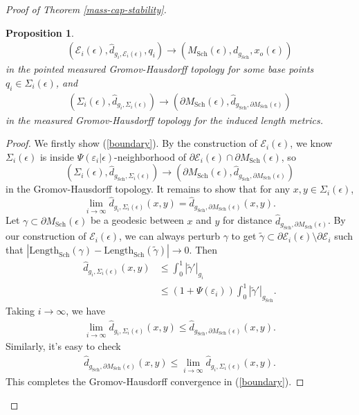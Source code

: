 \documentclass[letter]{amsart}
\newtheorem{prop}[thm]{Proposition}
\theoremstyle{definition}
\theoremstyle{remark}
\begin{document}
\begin{proof}[Proof of Theorem \ref{mass-cap-stability}]
\begin{prop}
	\begin{align}\label{total}
		(\mathcal{E}_{i}(\epsilon ), \hat{d}_{g_i, \mathcal{E}_i(\epsilon )}, q_i) \to (M_{\mathrm{Sch}}(\epsilon ), d_{g_{\mathrm{Sch}}}, x_o(\epsilon ) )
	\end{align}
	in the pointed measured Gromov-Hausdorff topology for some base points $q_i \in \Sigma _i(\epsilon )$, and
	\begin{align}\label{boundary}
		(\Sigma _i(\epsilon ), \hat{d}_{g_i, \Sigma _i(\epsilon )}) \to (\partial M_{\mathrm{Sch}}(\epsilon ), \hat{d}_{g_{\mathrm{Sch}}, \partial M_{\mathrm{Sch}}(\epsilon )} )
	\end{align}
	in the measured Gromov-Hausdorff topology for the induced length metrics.
\end{prop}
\begin{proof}
	We firstly show (\ref{boundary}). By the construction of $\mathcal{E}_i(\epsilon )$,
	we know $\Sigma _i(\epsilon )$ is inside $\Psi (\varepsilon _i| \epsilon )$-neighborhood of $\partial \mathcal{E}_i(\epsilon ) \cap \partial M_{\mathrm{Sch}}(\epsilon )$, so
		$$
		(\Sigma _i(\epsilon ), \hat{d}_{g_{\mathrm{Sch}}, \Sigma _i(\epsilon )} ) \to (\partial M_{\mathrm{Sch}}(\epsilon ), \hat{d}_{g_{\mathrm{Sch}}, \partial M_{\mathrm{Sch}}(\epsilon )})
		$$
		in the Gromov-Hausdorff topology. It remains to show that for any $x, y \in \Sigma _i(\epsilon )$,
	$$ \lim_{i\to \infty}\hat{d}_{g_i, \Sigma _i(\epsilon )}(x,y) = \hat{d}_{g_{\mathrm{Sch}}, \partial M_{\mathrm{Sch}}(\epsilon )}(x,y). $$
	Let $\gamma \subset \partial M_{\mathrm{Sch}}(\epsilon ) $ be a geodesic between $x$ and $y$ for distance $\hat{d}_{g_{\mathrm{Sch}}, \partial M_{\mathrm{Sch}}(\epsilon ) }$. By our construction of $\mathcal{E}_i(\epsilon )$, we can always perturb $\gamma $ to get $\tilde{\gamma } \subset \partial \mathcal{E}_i(\epsilon ) \setminus \partial \mathcal{E}_i$ such that $|\mathrm{Length}_{\mathrm{Sch}}(\gamma ) - \mathrm{Length}_{\mathrm{Sch}}(\tilde{\gamma })| \to 0$. Then 
	\begin{align*}
		\hat{d}_{g_i, \Sigma _i(\epsilon )}(x,y) &\leq \int_{0}^{1}|\tilde{\gamma }'|_{g_i} \\
	&\leq (1+ \Psi (\varepsilon _i) ) \int_{0}^{1}|\tilde{\gamma }'|_{g_{\mathrm{Sch}}} .
	\end{align*}
	Taking $i\to \infty$, we have
	\begin{align*}
		\lim_{i\to \infty}\hat{d}_{g_i, \Sigma _i(\epsilon )}(x,y) \leq \hat{d}_{g_{\mathrm{Sch}}, \partial M_{\mathrm{Sch}}(\epsilon )}(x,y).
	\end{align*}
	Similarly, it's easy to check 
	\begin{align*}
		\hat{d}_{g_{\mathrm{Sch}}, \partial M_{\mathrm{Sch}}(\epsilon )}(x,y) \leq \lim_{i\to \infty} \hat{d}_{g_i, \Sigma _i(\epsilon )}(x,y).
	\end{align*}
	This completes the Gromov-Hausdorff convergence in (\ref{boundary}).


\end{proof}
\end{proof}
\end{document}
